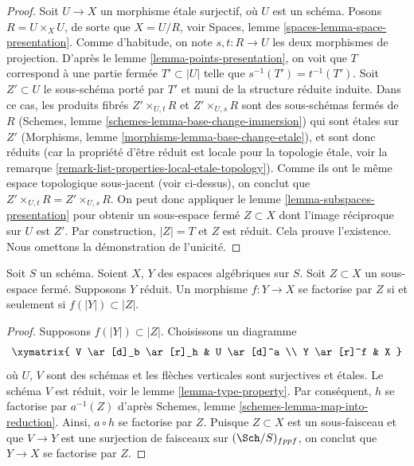 \begin{proof}
Soit $U \to X$ un morphisme \'etale surjectif, où $U$ est un schéma.
Posons $R = U \times_X U$, de sorte que $X = U/R$, voir
Spaces, lemme \ref{spaces-lemma-space-presentation}.
Comme d'habitude, on note $s, t : R \to U$ les deux morphismes de projection.
D'après le lemme \ref{lemma-points-presentation},
on voit que $T$ correspond à une partie fermée $T' \subset |U|$ telle
que $s^{-1}(T') = t^{-1}(T')$.
Soit $Z' \subset U$ le sous-schéma porté par $T'$ et muni de la structure réduite induite.
Dans ce cas, les produits fibrés
$Z' \times_{U, t} R$ et $Z' \times_{U, s} R$ sont des sous-schémas fermés
de $R$
(Schemes, lemme \ref{schemes-lemma-base-change-immersion})
qui sont \'etales sur $Z'$
(Morphisms, lemme \ref{morphisms-lemma-base-change-etale}),
et sont donc réduits
(car la propriété d'être réduit est locale pour la topologie \'etale, voir la
remarque \ref{remark-list-properties-local-etale-topology}).
Comme ils ont le même espace topologique sous-jacent (voir ci-dessus),
on conclut que $Z' \times_{U, t} R = Z' \times_{U, s} R$.
On peut donc appliquer le lemme \ref{lemma-subspaces-presentation}
pour obtenir un sous-espace fermé $Z \subset X$ dont l'image réciproque sur $U$ est $Z'$.
Par construction, $|Z| = T$ et $Z$ est réduit. Cela prouve l'existence.
Nous omettons la démonstration de l'unicité.
\end{proof}

\begin{lemma}
\label{lemma-map-into-reduction}
Soit $S$ un schéma.
Soient $X$, $Y$ des espaces algébriques sur $S$.
Soit $Z \subset X$ un sous-espace fermé.
Supposons $Y$ réduit.
Un morphisme $f : Y \to X$ se factorise par $Z$ si et seulement si
$f(|Y|) \subset |Z|$.
\end{lemma}

\begin{proof}
Supposons $f(|Y|) \subset |Z|$. Choisissons un diagramme
$$
\xymatrix{
V \ar[d]_b \ar[r]_h & U \ar[d]^a \\
Y \ar[r]^f & X
}
$$
où $U$, $V$ sont des schémas et les flèches verticales sont surjectives et
\'etales. Le schéma $V$ est réduit, voir le
lemme \ref{lemma-type-property}.
Par conséquent, $h$ se factorise par $a^{-1}(Z)$ d'après
Schemes, lemme \ref{schemes-lemma-map-into-reduction}.
Ainsi, $a \circ h$ se factorise par $Z$.
Puisque $Z \subset X$ est un sous-faisceau et que $V \to Y$ est une surjection de faisceaux
sur $(\Sch/S)_{fppf}$, on conclut que $Y \to X$ se factorise
par $Z$.
\end{proof}

